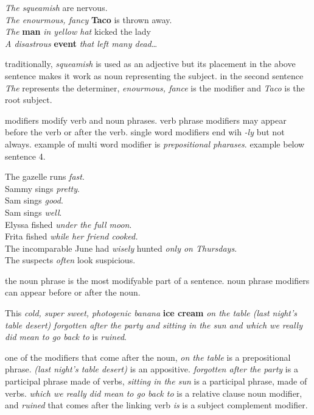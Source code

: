 \documentclass[a4paper]{article}
\begin{document}
\begin{flushleft}
    \emph{The squeamish} are nervous. \\
    \emph{The enourmous, fancy} \textbf{Taco} is thrown away. \\
    \emph{The} \textbf{man} \emph{in yellow hat} kicked the lady \\
    \emph{A disastrous} \textbf{event} \emph{that left many dead}\ldots
\end{flushleft}

traditionally, \emph{squeamish} is used as an adjective but its placement in the above sentence makes it work as noun representing the 
subject. in the second sentence \emph{The} represents the determiner, \emph{enourmous, fance} is the modifier and \emph{Taco} is the 
root subject.

modifiers modify verb and noun phrases. verb phrase modifiers may appear before the verb or after the verb. single word modifiers end
wih \emph{-ly} but not always. example of multi word modifier is \emph{prepositional pharases}. example below sentence 4.

\begin{flushleft}
    The gazelle runs \emph{fast}. \\
    Sammy sings \emph{pretty}. \\
    Sam sings \emph{good}. \\
    Sam sings \emph{well}. \\
    Elyssa fished \emph{under the full moon}. \\
    Frita fished \emph{while her friend cooked.} \\
    The incomparable June had \emph{wisely} hunted \emph{only on Thursdays}. \\
    The suspects \emph{often} look suspicious.
\end{flushleft}

the noun phrase is the most modifyable part of a sentence. noun phrase modifiers can appear before or after the noun.

\begin{flushleft}
    This \emph{cold, super sweet, photogenic banana} \textbf{ice cream} \emph{on the table (last night's table desert)
        forgotten after the party and sitting in the sun and which we really did mean to go back to} is \emph{ruined}.
\end{flushleft}

one of the modifiers that come after the noun, \emph{on the table} is a prepositional phrase. \emph{(last night's table desert)} is an 
appositive. \emph{forgotten after the party} is a participal phrase made of verbs, \emph{sitting in the sun} is a participal phrase,
made of verbs. \emph{which we really did mean to go back to} is a relative clause noun modifier, and \emph{ruined} that comes after the
linking verb \emph{is} is a subject complement modifier.
\end{document}

